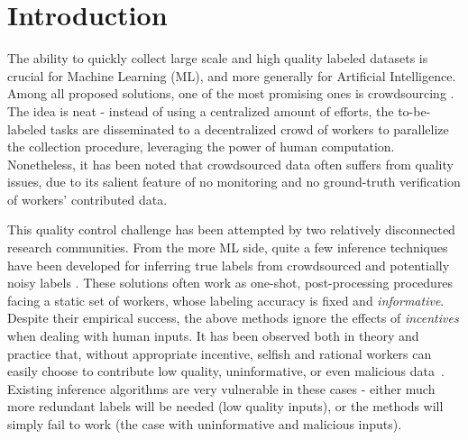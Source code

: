 \section{Introduction}
The ability to quickly collect large scale and high quality labeled datasets is crucial for Machine Learning (ML), and more generally for Artificial Intelligence. Among all proposed solutions, one of the most promising ones is crowdsourcing \cite{Howe2006,slivkins2014online,difallah2015dynamics,simpson2015language}. The idea is neat - instead of using a centralized amount of efforts, the to-be-labeled tasks are disseminated to a decentralized crowd of workers to parallelize the collection procedure, leveraging the power of human computation. Nonetheless, it has been noted that crowdsourced data often suffers from quality issues, due to its salient feature of no monitoring and no ground-truth verification of workers' contributed data. %

This quality control challenge has been attempted by two relatively disconnected research communities. From the more ML side, quite a few inference techniques have been developed for inferring true labels from crowdsourced and potentially noisy labels \citep{raykar2010learning,liu2012variational,zhou2014aggregating,zheng2017truth}. These solutions often work as one-shot, post-processing procedures facing a static set of workers, whose labeling accuracy is fixed and \emph{informative}. Despite their empirical success, the above methods ignore the effects of \emph{incentives} when dealing with human inputs. It has been observed both in theory and practice that, without appropriate incentive, selfish and rational workers can easily choose to contribute low quality, uninformative, or even malicious data~\citep{sheng2008get,liu2017sequential}. Existing inference algorithms are very vulnerable in these cases - either much more redundant labels will be needed (low quality inputs), or the methods will simply fail to work (the case with uninformative and malicious inputs). 

